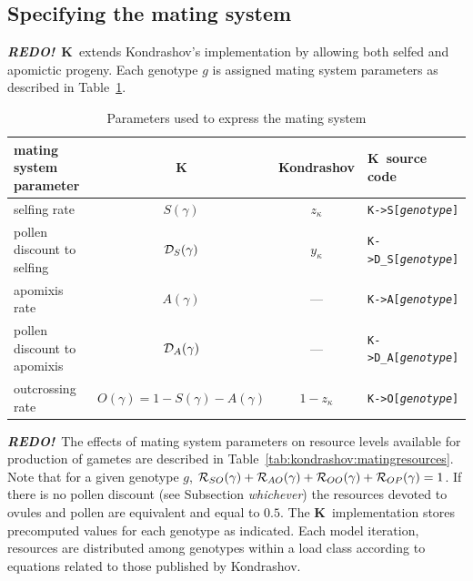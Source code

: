 \documentclass[10pt,twoside,a4paper,fleqn]{report}
\numberwithin{equation}{section}  %
\newcommand{\REDO}{{\bf {\em REDO!}}}
\newcommand{\K}{{\bf K}}
\newcommand{\Kmemberi}[2]{\mbox{{\tt K->#1[{\it #2}\/]}}}
\newcommand{\Sg}{\mbox{$S(\gamma)$}}
\newcommand{\DSg}{\mbox{${\cal D}_{S}(\gamma)$}}
\newcommand{\Ag}{\mbox{$A(\gamma)$}}
\newcommand{\DAg}{\mbox{${\cal D}_{A}(\gamma)$}}
\newcommand{\Og}{\mbox{$O(\gamma)$}}
\newcommand{\RSOg}{\mbox{${\cal R}_{SO}(\gamma)$}}
\newcommand{\RAOg}{\mbox{${\cal R}_{AO}(\gamma)$}}
\newcommand{\ROOg}{\mbox{${\cal R}_{OO}(\gamma)$}}
\newcommand{\ROPg}{\mbox{${\cal R}_{OP}(\gamma)$}}
\begin{document}
{\subsection{Specifying the mating system}

\REDO\  \K\ extends Kondrashov's implementation by allowing both selfed and apomictic progeny.  Each genotype $g$ is assigned mating system parameters as described in Table~\ref{tab:matingparameters}.

\begin{table}
	\begin{center}
	  {\small
		\begin{tabular}{@{}l|c|c|l@{}}
mating system parameter			&	\K       				&	Kondrashov		& \K\ source code     \\
\hline %
\hline %
selfing rate								& \Sg							& $z_\kappa$		&	\Kmemberi{S}{genotype}  \\
pollen discount to selfing	& \DSg						& $y_\kappa$		& \Kmemberi{D\_S}{genotype} \\
apomixis rate								& \Ag							& ---     			& \Kmemberi{A}{genotype}   \\
pollen discount to apomixis	& \DAg						& ---     			& \Kmemberi{D\_A}{genotype} \\
outcrossing rate						& $\Og=1-\Sg-\Ag$	& $1-z_\kappa$	&	\Kmemberi{O}{genotype} \\
		\end{tabular}
		}
	\end{center}
	\caption{Parameters used to express the mating system}
	\label{tab:matingparameters}
\end{table}

\REDO\   The effects of mating system parameters on resource levels available for production of gametes are described in Table~\ref{tab:kondrashov:matingresources}.  Note that for a given genotype $g$, $\RSOg+\RAOg+\ROOg+\ROPg=1$.  If there is no pollen discount (see Subsection {\em whichever}) the resources devoted to ovules and pollen are equivalent and equal to $0.5$.  The \K\ implementation stores precomputed values for each genotype as indicated.  Each model iteration, resources are distributed among genotypes within a load class according to equations related to those published by Kondrashov.

}
\end{document}
